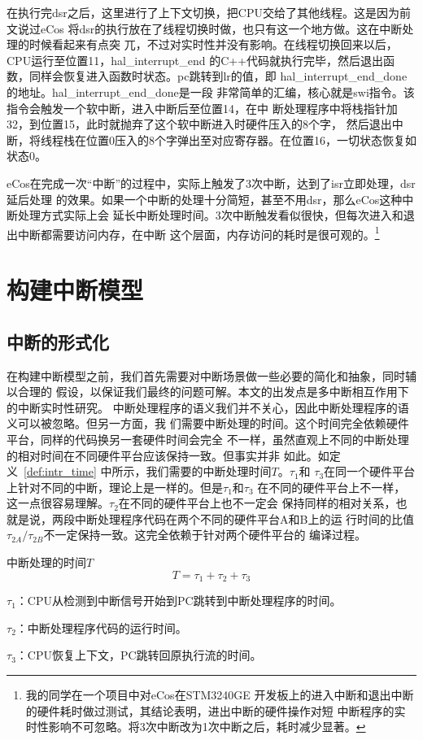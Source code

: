 在执行完dsr之后，这里进行了上下文切换，把CPU交给了其他线程。这是因为前文说过eCos
将dsr的执行放在了线程切换时做，也只有这一个地方做。这在中断处理的时候看起来有点突
兀，不过对实时性并没有影响。在线程切换回来以后，CPU运行至位置11，hal\_interrupt\_end
的C++代码就执行完毕，然后退出函数，同样会恢复进入函数时状态。pc跳转到lr的值，即
hal\_interrupt\_end\_done的地址。\cite{AAPCS}hal\_interrupt\_end\_done是一段
非常简单的汇编，核心就是swi指令。该指令会触发一个软中断，进入中断后至位置14，在中
断处理程序中将栈指针加32，到位置15，此时就抛弃了这个软中断进入时硬件压入的8个字，
然后退出中断，将线程栈在位置0压入的8个字弹出至对应寄存器。在位置16，一切状态恢复如
状态0。

eCos在完成一次“中断”的过程中，实际上触发了3次中断，达到了isr立即处理，dsr延后处理
的效果。如果一个中断的处理十分简短，甚至不用dsr，那么eCos这种中断处理方式实际上会
延长中断处理时间。3次中断触发看似很快，但每次进入和退出中断都需要访问内存，在中断
这个层面，内存访问的耗时是很可观的。\footnote{我的同学在一个项目中对eCos在STM3240GE
开发板上的进入中断和退出中断的硬件耗时做过测试，其结论表明，进出中断的硬件操作对短
中断程序的实时性影响不可忽略。将3次中断改为1次中断之后，耗时减少显著。}

\section{构建中断模型}
\label{sec:intr_model}

\subsection{中断的形式化}
\label{subsec:intr_formal}

在构建中断模型之前，我们首先需要对中断场景做一些必要的简化和抽象，同时辅以合理的
假设，以保证我们最终的问题可解。本文的出发点是多中断相互作用下的中断实时性研究。
中断处理程序的语义我们并不关心，因此中断处理程序的语义可以被忽略。但另一方面，我
们需要中断处理的时间。这个时间完全依赖硬件平台，同样的代码换另一套硬件时间会完全
不一样，虽然直观上不同的中断处理的相对时间在不同硬件平台应该保持一致。但事实并非
如此。如定义~\ref{def:intr_time} 中所示，我们需要的中断处理时间$T$。$\tau_1$和
$\tau_3$在同一个硬件平台上针对不同的中断，理论上是一样的。但是$\tau_1$和$\tau_3$
在不同的硬件平台上不一样，这一点很容易理解。$\tau_2$在不同的硬件平台上也不一定会
保持同样的相对关系，也就是说，两段中断处理程序代码在两个不同的硬件平台A和B上的运
行时间的比值$\tau_{2A}/\tau_{2B}$不一定保持一致。这完全依赖于针对两个硬件平台的
编译过程。

\begin{definition}
	中断处理的时间$T$
	\label{def:intr_time}
	\begin{equation}
	T = \tau_1 + \tau_2 + \tau_3
	\end{equation}
	
	$\tau_1$：CPU从检测到中断信号开始到PC跳转到中断处理程序的时间。
	
	$\tau_2$：中断处理程序代码的运行时间。
	
	$\tau_3$：CPU恢复上下文，PC跳转回原执行流的时间。
\end{definition}

